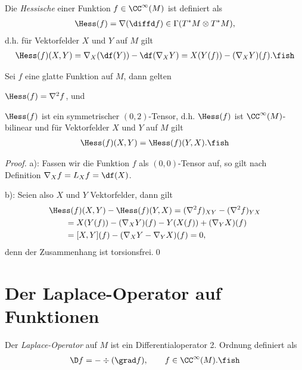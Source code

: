 \documentclass[%
	paper=a5,%
	fleqn,%
	DIV=18,%
	BCOR=0mm,
	fontsize=11pt,
	titlepage=false,%
	bibliography=totoc,
	DIV=18,%
	twoside=true,
	pdftitle=Riemannsche Geometrie,
	pdfauthor=Uwe Semmelmann,
	numbers=noendperiod]%
	{scrbook}
\begin{document}
\begin{defn}
Die \emph{Hessische} einer Funktion $f\in\CC^\infty(M)$ ist definiert als
\begin{align*}
\Hess(f) = \nabla(\diffd f) \in\Gamma(T^*M\otimes T^*M),
\end{align*}
d.h. für Vektorfelder $X$ und $Y$ auf $M$ gilt
\begin{align*}
\Hess(f)(X,Y) = \nabla_{X}(\df(Y)) - \df(\nabla_{X}Y) = X(Y(f)) - (\nabla_{X}Y)(f).\fish
\end{align*}
\end{defn}

\begin{lem}
Sei $f$ eine glatte Funktion auf $M$, dann gelten
\begin{propenum}
\item $\Hess(f) = \nabla^2 f$, und
\item $\Hess(f)$ ist ein symmetrischer $(0,2)$-Tensor, d.h. $\Hess(f)$ ist $\CC^\infty(M)$-bilinear und für Vektorfelder $X$ und $Y$ auf $M$ gilt
\begin{align*}
\Hess(f)(X,Y) = \Hess(f)(Y,X).\fish
\end{align*}
\end{propenum}
\end{lem}

\begin{proof}
a): Fassen wir die Funktion $f$ als $(0,0)$-Tensor auf, so gilt nach Definition $\nabla_{X} f = L_{X}f = \df(X)$.

b): Seien also $X$ und $Y$ Vektorfelder, dann gilt
\begin{align*}
&\Hess(f)(X,Y) - \Hess(f)(Y,X) = (\nabla^2 f)_{XY}-(\nabla^2 f)_{YX} \\
&\qquad= 
X(Y(f)) - (\nabla_{X}Y)(f) - Y(X(f)) + (\nabla_{Y}X)(f)\\
&\qquad= [X,Y](f) - (\nabla_{X}Y-\nabla_{Y}X)(f) = 0,
\end{align*}
denn der Zusammenhang ist torsionsfrei.\qed
\end{proof}

\section{Der Laplace-Operator auf Funktionen}

\begin{defn}
Der \emph{Laplace-Operator} auf $M$ ist ein Differentialoperator 2. Ordnung definiert als
\begin{align*}
\D f = - \div(\grad f),\qquad f\in\CC^\infty(M).\fish
\end{align*}
\end{defn}
\end{document}
